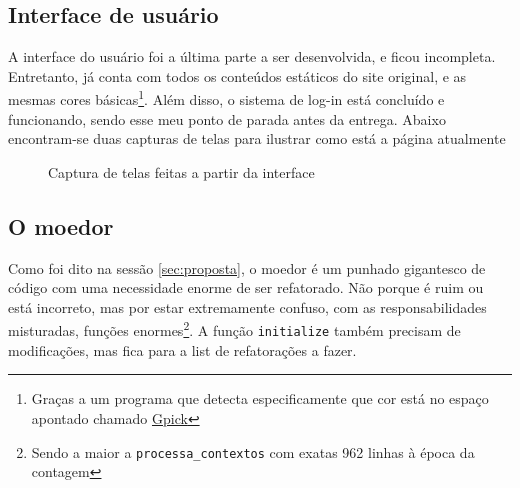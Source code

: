 \subsection{Interface de usuário}\label{subsec:gui}

A interface do usuário foi a última parte a ser desenvolvida, e ficou incompleta. Entretanto, já conta com todos os
conteúdos estáticos do site original, e as mesmas cores básicas\footnote{Graças a um programa que detecta especificamente
que cor está no espaço apontado chamado \href{http://www.gpick.org/}{Gpick}}. Além disso, o sistema de log-in está
concluído e funcionando, sendo esse meu ponto de parada antes da entrega. Abaixo encontram-se duas capturas de telas para
ilustrar como está a página atualmente

\begin{figure}[htb]
  \centering
  \caption{Captura de telas feitas a partir da interface}
  \label{fig:screenshots}
\end{figure}

\subsection{O moedor}\label{subsec:o-moedor}

Como foi dito na sessão \ref{sec:proposta}, o moedor é um punhado gigantesco de código com uma necessidade enorme de
ser refatorado. Não porque é ruim ou está incorreto, mas por estar extremamente confuso, com as responsabilidades
misturadas, funções enormes\footnote{Sendo a maior a \texttt{processa\_contextos} com exatas 962 linhas à época da
contagem}. A função \texttt{initialize} também precisam de modificações, mas fica para a list de refatorações a fazer.

